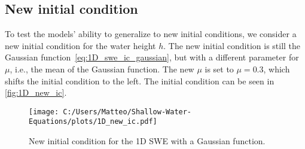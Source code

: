 \subsection*{New initial condition}
To test the models' ability to generalize to new initial conditions, we consider a new initial condition for the water height $h$.
The new initial condition is still the Gaussian function~\eqref{eq:1D_swe_ic_gaussian}, but with a different parameter for $\mu$, i.e., the mean of the Gaussian function.
The new $\mu$ is set to $\mu = 0.3$, which shifts the initial condition to the left.
The initial condition can be seen in \autoref{fig:1D_new_ic}.
\begin{figure}[H]
    \centering
    \texttt{[image: C:/Users/Matteo/Shallow-Water-Equations/plots/1D\_new\_ic.pdf]}
    \caption{New initial condition for the 1D SWE with a Gaussian function.}\label{fig:1D_new_ic}
\end{figure}



